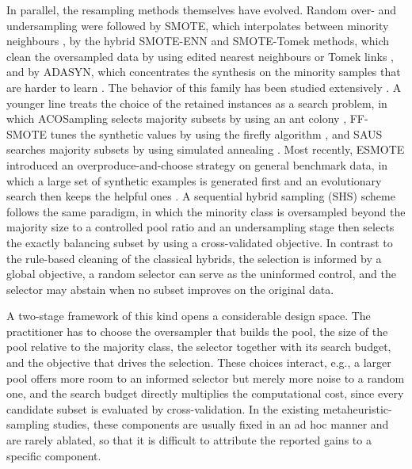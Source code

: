 \documentclass[10pt,a4paper]{article}
\begin{document}
In parallel, the resampling methods themselves have evolved. Random
over- and undersampling were followed by SMOTE, which interpolates
between minority neighbours \citep{chawla2002smote}, by the hybrid
SMOTE-ENN and SMOTE-Tomek methods, which clean the oversampled data by
using edited nearest neighbours or Tomek links \citep{batista2004study},
and by ADASYN, which concentrates the synthesis on the minority samples
that are harder to learn \citep{he2008adasyn}. The behavior of this
family has been studied extensively \citep{fernandez2018smote,
kim2022empirical, wongvorachan2023comparison, mohammed2020machine,
devi2020review}. A younger line treats the choice of the retained
instances as a search problem, in which ACOSampling selects majority
subsets by using an ant colony \citep{yu2013acosampling}, FF-SMOTE
tunes the synthetic values by using the firefly algorithm
\citep{kaur2019ffsmote}, and SAUS searches majority subsets by using
simulated annealing \citep{chennuru2022simulated}. Most recently, ESMOTE
introduced an overproduce-and-choose strategy on general benchmark data,
in which a large set of synthetic examples is generated first and an
evolutionary search then keeps the helpful ones \citep{zhang2023esmote}.
A sequential hybrid sampling (SHS) scheme follows the same paradigm, in
which the minority class is oversampled beyond the majority size to a
controlled pool ratio and an undersampling stage then selects the
exactly balancing subset by using a cross-validated objective. In
contrast to the rule-based cleaning of the classical hybrids, the
selection is informed by a global objective, a random selector can serve
as the uninformed control, and the selector may abstain when no subset
improves on the original data.

A two-stage framework of this kind opens a considerable design space.
The practitioner has to choose the oversampler that builds the pool, the
size of the pool relative to the majority class, the selector together
with its search budget, and the objective that drives the selection.
These choices interact, e.g., a larger pool offers more room to an
informed selector but merely more noise to a random one, and the search
budget directly multiplies the computational cost, since every candidate
subset is evaluated by cross-validation. In the existing
metaheuristic-sampling studies, these components are usually fixed in an
ad hoc manner and are rarely ablated, so that it is difficult to
attribute the reported gains to a specific component.
\end{document}
